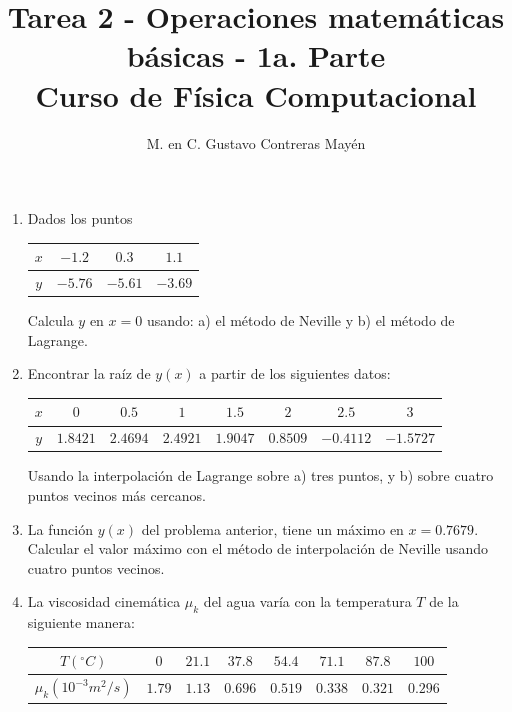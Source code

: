 \documentclass[11pt]{article}
\title{Tarea 2 - Operaciones matemáticas básicas - 1a. Parte \\ Curso de Física Computacional}
\author{M. en C. Gustavo Contreras Mayén}
\date{ }
\begin{document}
\maketitle
\fontsize{13}{13}\selectfont
\begin{enumerate}
	\item Dados los puntos
	\begin{table}[H]
		\centering 
		\begin{large}
			\begin{tabulary}{15cm}{c | c | c | c  }\normalsize
				$x$ & $-1.2$ & $0.3$ & $1.1$ \\
				\midrule
				$y$ & $-5.76$ & $-5.61$ & $-3.69$
			\end{tabulary}
		\end{large}
	\end{table}
	Calcula $y$ en $x=0$ usando: a) el método de Neville y b) el método de Lagrange.
	\item Encontrar la raíz de $y(x)$ a partir de los siguientes datos:
	\begin{table}[H]
		\centering 
		\begin{large}
			\begin{tabulary}{15cm}{c | c | c | c | c | c | c | c }
				$x$ & $0$ & $0.5$ & $1$ & $1.5$ & $2$ & $2.5$ & $3$ \\
				\midrule
				$y$ & $1.8421$ & $2.4694$ & $2.4921$ & $1.9047$ & $0.8509$ & $-0.4112$ & $-1.5727$ 
			\end{tabulary}
		\end{large}	
	\end{table}
	Usando la interpolación de Lagrange sobre a) tres puntos, y b) sobre cuatro puntos vecinos más cercanos.
	\item La función $y(x)$ del problema anterior, tiene un máximo en $x=0.7679$. Calcular el valor máximo con el método de interpolación de Neville usando cuatro puntos vecinos.
	\item La viscosidad cinemática $\mu_{k}$ del agua varía con la temperatura $T$ de la siguiente manera:
	\begin{table}[H]
		\centering
			\begin{large} 
				\begin{tabulary}{15cm}{c | c | c | c | c | c | c | c }
					$T(^\circ C)$ & $0$ & $21.1$ & $37.8$ & $54.4$ & $71.1$ & $87.8$ & $100$ \\
					\midrule
					$\mu_{k} (10^{-3}m^{2}/s)$ & $1.79$ & $1.13$ & $0.696$ & $0.519$ & $0.338$ & $0.321$ & $0.296$ 
				\end{tabulary}

\end{large}
\end{table}
\end{enumerate}
\end{document}
